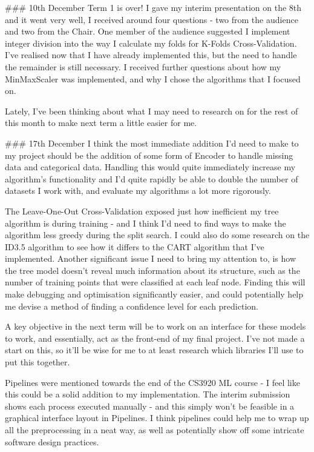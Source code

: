 \documentclass[letterpaper,10pt]{article}
\begin{document}
\begin{markdown}
### 10th December
Term 1 is over! I gave my interim presentation on the 8th and it went very well, I received around four questions - two from the audience and two from the Chair. One member of the audience suggested I implement integer division into the way I calculate my folds for K-Folds Cross-Validation. I've realised now that I have already implemented this, but the need to handle the remainder is still necessary. I received further questions about how my MinMaxScaler was implemented, and why I chose the algorithms that I focused on.  
  
Lately, I've been thinking about what I may need to research on for the rest of this month to make next term a little easier for me.

### 17th December
I think the most immediate addition I'd need to make to my project should be the addition of some form of Encoder to handle missing data and categorical data. Handling this would quite immediately increase my algorithm's functionality and I'd quite rapidly be able to double the number of datasets I work with, and evaluate my algorithms a lot more rigorously.  
  
The Leave-One-Out Cross-Validation exposed just how inefficient my tree algorithm is during training - and I think I'd need to find ways to make the algorithm less greedy during the split search. I could also do some research on the ID3.5 algorithm to see how it differs to the CART algorithm that I've implemented.  
Another significant issue I need to bring my attention to, is how the tree model doesn't reveal much information about its structure, such as the number of training points that were classified at each leaf node. Finding this will make debugging and optimisation significantly easier, and could potentially help me devise a method of finding a confidence level for each prediction.  
  
A key objective in the next term will be to work on an interface for these models to work, and essentially, act as the front-end of my final project. I've not made a start on this, so it'll be wise for me to at least research which libraries I'll use to put this together.  
  
Pipelines were mentioned towards the end of the CS3920 ML course - I feel like this could be a solid addition to my implementation. The interim submission shows each process executed manually - and this simply won't be feasible in a graphical interface layout in Pipelines. I think pipelines could help me to wrap up all the preprocessing in a neat way, as well as potentially show off some intricate software design practices.  


\end{markdown}
\end{document}
